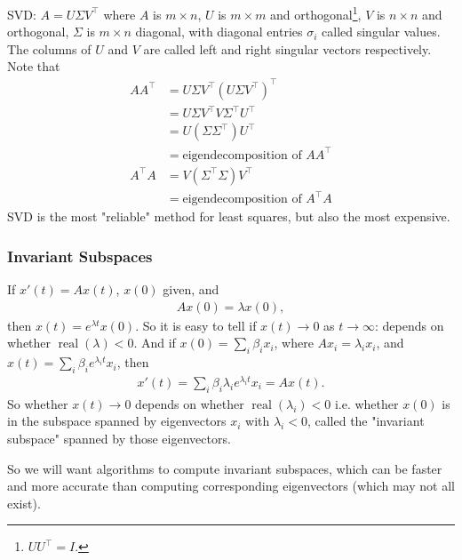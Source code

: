 \documentclass[11pt]{article}
\numberwithin{equation}{section}
\begin{document}
SVD: $A = U\Sigma V^{\top}$ where $A$ is $m \times n$, $U$ is $m \times m$ and orthogonal\footnote{$UU^\top = I$.}, $V$ is $n \times n$ and orthogonal, 
$\Sigma$ is $m \times n$ diagonal, with diagonal entries $\sigma_i$ called singular values. 
The columns of $U$ and $V$ are called left and right singular vectors respectively. Note that  \begin{align*}
    AA^{\top} &= U\Sigma V^{\top}(U\Sigma V^{\top})^{\top} \\
    &= U\Sigma V^{\top}V\Sigma ^{\top}U^{\top} \\
    &= U(\Sigma \Sigma^{\top})U^{\top} \\
    &= \text{eigendecomposition of }AA^{\top}
\end{align*}
\begin{align*}
    A^{\top}A &= V(\Sigma^{\top}\Sigma )V^{\top} \\
    &= \text{eigendecomposition of } A^{\top}A
\end{align*}
SVD is the most "reliable" method for least squares, but also the most expensive.

\subsubsection{Invariant Subspaces}
If $x'(t) = Ax(t)$, $x(0)$ given, and \begin{align*}
    Ax(0) = \lambda x(0),
\end{align*}
then $x(t) = e^{\lambda t} x(0)$. So it is easy to tell if $x(t) \rightarrow 0$ as $t \rightarrow \infty$: depends on whether $\operatorname{real}(\lambda) < 0$. 
And if $x(0) = \sum_i \beta_i x_i$, where $Ax_i=\lambda_i x_i$, and $x(t) = \sum_i \beta_i e^{\lambda_i t} x_i$, then \begin{align*}
    x'(t) = \sum_i \beta_i \lambda_i e^{\lambda_i t} x_i = Ax(t).
\end{align*}
So whether $x(t)\rightarrow 0$ depends on whether $\operatorname{real}(\lambda_i) < 0$ i.e. whether $x(0)$ is in the subspace spanned by eigenvectors $x_i$ with $\lambda_i < 0$, 
called the "invariant subspace" spanned by those eigenvectors.

So we will want algorithms to compute invariant subspaces, which can be faster and more accurate than computing corresponding eigenvectors (which may not all exist).
\end{document}
